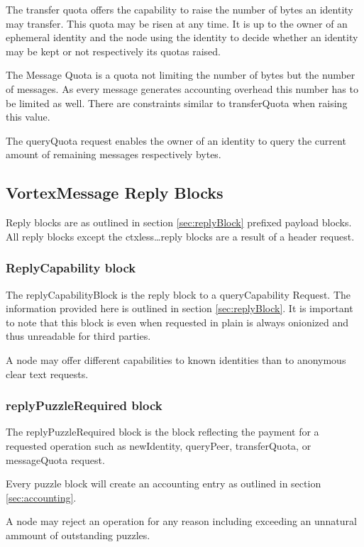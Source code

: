 The transfer quota offers the capability to raise the number of bytes an identity may transfer. This quota may be risen at any time. It is up to the owner of an ephemeral identity and the node using the identity to decide whether an identity may be kept or not respectively its quotas raised.

The Message Quota is a quota not limiting the number of bytes but the number of messages. As every message generates accounting overhead this number has to be limited as well. There are constraints similar to transferQuota when raising this value.

The queryQuota request enables the owner of an identity to query the current amount of remaining messages respectively bytes.

\subsection{VortexMessage Reply Blocks}
Reply blocks are as outlined in section \ref{sec:replyBlock} prefixed payload blocks. All reply blocks except the ctxless\ldots reply blocks are a result of a header request.

\subsubsection{ReplyCapability block}
The replyCapabilityBlock is the reply block to a queryCapability Request. The information provided here is outlined in section \ref{sec:replyBlock}. It is important to note that this block is even when requested in plain is always onionized and thus unreadable for third parties. 

A node may offer different capabilities to known identities than to anonymous clear text requests.

\subsubsection{replyPuzzleRequired block}


The replyPuzzleRequired block is the block reflecting the payment for a requested operation such as newIdentity, queryPeer, transferQuota, or messageQuota request.

Every puzzle block will create an accounting entry as outlined in section \ref{sec:accounting}. 

A node may reject an operation for any reason including exceeding an unnatural ammount of outstanding puzzles.

